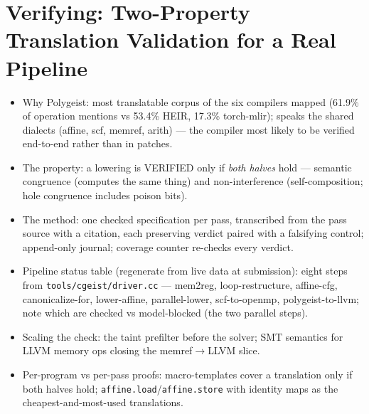 \section{Verifying: Two-Property Translation Validation for a Real Pipeline}


\begin{itemize}
  \item Why Polygeist: most translatable corpus of the six compilers mapped
    (61.9\% of operation mentions vs 53.4\% HEIR, 17.3\% torch-mlir); speaks
    the shared dialects (affine, scf, memref, arith) --- the compiler most
    likely to be verified end-to-end rather than in patches.
  \item The property: a lowering is VERIFIED only if \emph{both halves} hold ---
    semantic congruence (computes the same thing) and non-interference
    (self-composition; hole congruence includes poison bits).
  \item The method: one checked specification per pass, transcribed from the
    pass source with a citation, each preserving verdict paired with a
    falsifying control; append-only journal; coverage counter re-checks every
    verdict.
  \item Pipeline status table (regenerate from live data at submission):
    eight steps from \texttt{tools/cgeist/driver.cc} --- mem2reg,
    loop-restructure, affine-cfg, canonicalize-for, lower-affine,
    parallel-lower, scf-to-openmp, polygeist-to-llvm; note which are checked
    vs model-blocked (the two parallel steps).
  \item Scaling the check: the taint prefilter before the solver; SMT semantics
    for LLVM memory ops closing the memref$\rightarrow$LLVM slice.
  \item Per-program vs per-pass proofs: macro-templates cover a translation
    only if both halves hold; \texttt{affine.load}/\texttt{affine.store} with
    identity maps as the cheapest-and-most-used translations.
\end{itemize}
